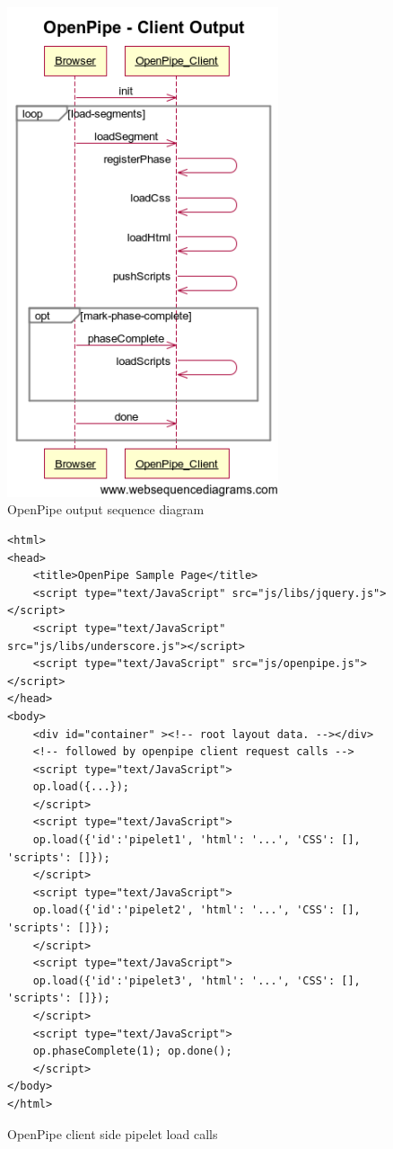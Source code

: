 \documentclass[12pt]{report}
\begin{document}
\begin{figure}[H]
\centering
\includegraphics[width=80mm]{figures/images/openpipe_clientoutput.png}
\caption{OpenPipe output sequence diagram}
\label{fig:openPipeClientOutputSequenceDiagram}
\end{figure}

\begin{figure}[H]
\begin{lstlisting}
<html>
<head>
	<title>OpenPipe Sample Page</title>
	<script type="text/JavaScript" src="js/libs/jquery.js"></script>
	<script type="text/JavaScript" src="js/libs/underscore.js"></script>
	<script type="text/JavaScript" src="js/openpipe.js"></script>
</head>
<body>
	<div id="container" ><!-- root layout data. --></div>
	<!-- followed by openpipe client request calls -->
	<script type="text/JavaScript">
	op.load({...});
	</script>
	<script type="text/JavaScript">
	op.load({'id':'pipelet1', 'html': '...', 'CSS': [], 'scripts': []});
	</script>
	<script type="text/JavaScript">
	op.load({'id':'pipelet2', 'html': '...', 'CSS': [], 'scripts': []});
	</script>
	<script type="text/JavaScript">
	op.load({'id':'pipelet3', 'html': '...', 'CSS': [], 'scripts': []});
	</script>
	<script type="text/JavaScript">
	op.phaseComplete(1); op.done();
	</script>
</body>
</html>
\end{lstlisting}
\caption{OpenPipe client side pipelet load calls}
\label{fig:openPipeClientPipeletLoadCalls}
\end{figure}
\end{document}
